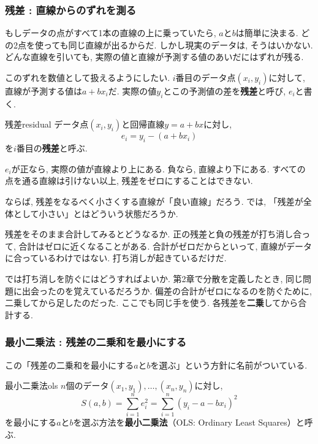 \subsubsection*{残差 : 直線からのずれを測る}

もしデータの点がすべて1本の直線の上に乗っていたら, $a$と$b$は簡単に決まる.
どの2点を使っても同じ直線が出るからだ.
しかし現実のデータは, そうはいかない.
どんな直線を引いても, 実際の値と直線が予測する値のあいだにはずれが残る.

このずれを数値として扱えるようにしたい.
$i$番目のデータ点$(x_i, y_i)$に対して, 直線が予測する値は$a + bx_i$だ.
実際の値$y_i$とこの予測値の差を\textbf{残差}と呼び, $e_i$と書く.

\begin{defi}{残差}{residual}
データ点$(x_i, y_i)$と回帰直線$y = a + bx$に対し,
\[
  e_i = y_i - (a + bx_i)
\]
を$i$番目の\textbf{残差}と呼ぶ.
\end{defi}

$e_i$が正なら, 実際の値が直線より上にある.
負なら, 直線より下にある.
すべての点を通る直線は引けない以上, 残差をゼロにすることはできない.

ならば, 残差をなるべく小さくする直線が「良い直線」だろう.
では, 「残差が全体として小さい」とはどういう状態だろうか.

残差をそのまま合計してみるとどうなるか.
正の残差と負の残差が打ち消し合って, 合計はゼロに近くなることがある.
合計がゼロだからといって, 直線がデータに合っているわけではない.
打ち消しが起きているだけだ.

では打ち消しを防ぐにはどうすればよいか.
第2章で分散を定義したとき, 同じ問題に出会ったのを覚えているだろうか.
偏差の合計がゼロになるのを防ぐために, 二乗してから足したのだった.
ここでも同じ手を使う.
各残差を\textbf{二乗}してから合計する.

\subsubsection*{最小二乗法 : 残差の二乗和を最小にする}

この「残差の二乗和を最小にする$a$と$b$を選ぶ」という方針に名前がついている.

\begin{defi}{最小二乗法}{ols}
$n$個のデータ$(x_1, y_1), \ldots, (x_n, y_n)$に対し,
\[
  S(a, b) = \sum_{i=1}^{n} e_i^2 = \sum_{i=1}^{n} (y_i - a - bx_i)^2
\]
を最小にする$a$と$b$を選ぶ方法を\textbf{最小二乗法}（OLS: Ordinary Least Squares）と呼ぶ.
\end{defi}


